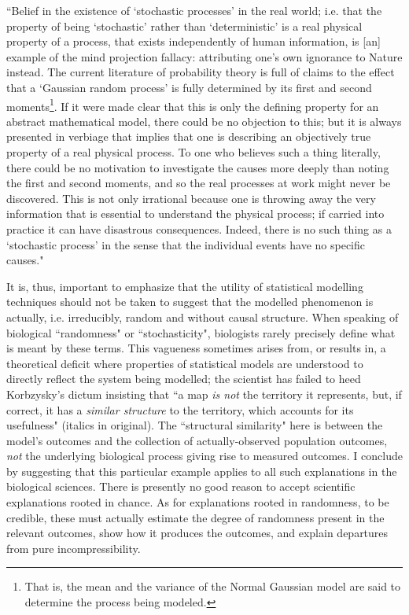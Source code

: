 \documentclass{ut-thesis}
\begin{document}
\begin{NoHyper}
\begin{longquote}
 ``Belief in the existence of ‘stochastic processes’ in the real world; i.e. that the property of being ‘stochastic’ rather than ‘deterministic’ is a real physical property of a process, that exists independently of human information, is [an] example of the mind projection fallacy: attributing one’s own ignorance to Nature instead. The current literature of probability theory is full of claims to the effect that a ‘Gaussian random process’ is fully determined by its first and second moments\footnote{That is, the mean and the variance of the Normal Gaussian model are said to determine the process being modeled.}. If it were made clear that this is only the defining property for an abstract mathematical model, there could be no objection to this; but it is always presented in verbiage that implies that one is describing an objectively true property of a real physical process. To one who believes such a thing literally, there could be no motivation to investigate the causes more deeply than noting the first and second moments, and so the real processes at work might never be discovered. This is not only irrational because one is throwing away the very information that is essential to understand the physical process; if carried into practice it can have disastrous consequences. Indeed, there is no such thing as a ‘stochastic process’ in the sense that the individual events have no specific causes." \cite{Jaynes2003}
 \end{longquote}

It is, thus, important to emphasize that the utility of statistical modelling techniques should not be taken to suggest that the modelled phenomenon is actually, i.e. irreducibly, random and without causal structure. When speaking of biological ``randomness" or ``stochasticity", biologists rarely precisely define what is meant by these terms. This vagueness sometimes arises from, or results in, a theoretical deficit where properties of statistical models are understood to directly reflect the system being modelled; the scientist has failed to heed Korbzysky's dictum insisting that ``a map \textit{is not} the territory it represents, but, if correct, it has a \textit{similar structure} to the territory, which accounts for its usefulness" \cite{Korzybski2005} (italics in original). The ``structural similarity" here is between the model's outcomes and the collection of actually-observed population outcomes, \textit{not} the underlying biological process giving rise to measured outcomes. I conclude by suggesting that this particular example applies to all such explanations in the biological sciences. There is presently no good reason to accept scientific explanations rooted in chance. As for explanations rooted in randomness, to be credible, these must actually estimate the degree of randomness present in the relevant outcomes, show how it produces the outcomes, and explain departures from pure incompressibility.


\end{NoHyper}
\end{document}
